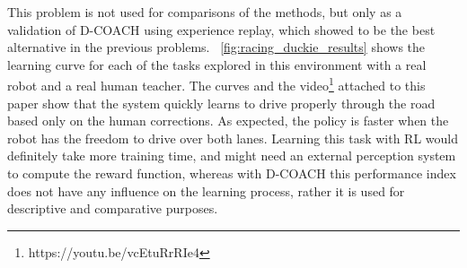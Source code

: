 This problem is not used for comparisons of the methods, but only as a validation of D-COACH using experience replay, which showed to be the best alternative in the previous problems. \figurename~\ref{fig:racing_duckie_results} shows the learning curve for each of the tasks explored in this environment with a real robot and a real human teacher. The curves and the video\footnote{https://youtu.be/vcEtuRrRIe4} attached to this paper show that the system quickly learns to drive properly through the road based only on the human corrections. As expected, the policy is faster when the robot has the freedom to drive over both lanes. Learning this task with RL would definitely take more training time, and might need an external perception system to compute the reward function, whereas with D-COACH this performance index does not have any influence on the learning process, rather it is used for descriptive and comparative purposes.


